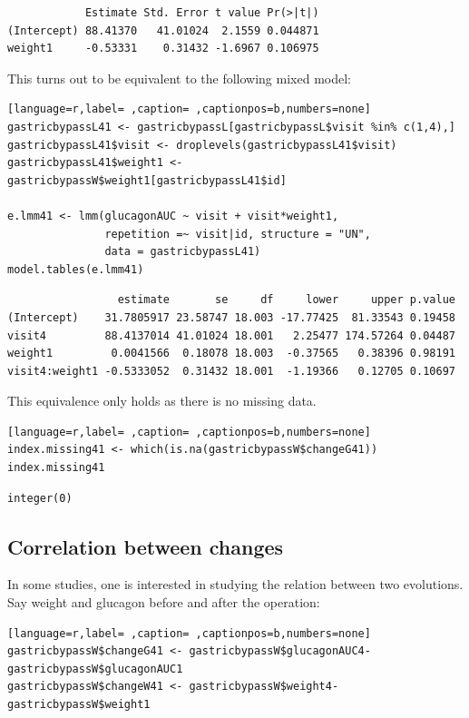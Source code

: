 \documentclass[12pt]{article}
\begin{document}
\begin{verbatim}
            Estimate Std. Error t value Pr(>|t|)
(Intercept) 88.41370   41.01024  2.1559 0.044871
weight1     -0.53331    0.31432 -1.6967 0.106975
\end{verbatim}


This turns out to be equivalent to the following mixed model:
\begin{lstlisting}[language=r,label= ,caption= ,captionpos=b,numbers=none]
gastricbypassL41 <- gastricbypassL[gastricbypassL$visit %in% c(1,4),]
gastricbypassL41$visit <- droplevels(gastricbypassL41$visit)
gastricbypassL41$weight1 <- gastricbypassW$weight1[gastricbypassL41$id]

e.lmm41 <- lmm(glucagonAUC ~ visit + visit*weight1,
               repetition =~ visit|id, structure = "UN",
               data = gastricbypassL41)
model.tables(e.lmm41)
\end{lstlisting}

\begin{verbatim}
                 estimate       se     df     lower     upper p.value
(Intercept)    31.7805917 23.58747 18.003 -17.77425  81.33543 0.19458
visit4         88.4137014 41.01024 18.001   2.25477 174.57264 0.04487
weight1         0.0041566  0.18078 18.003  -0.37565   0.38396 0.98191
visit4:weight1 -0.5333052  0.31432 18.001  -1.19366   0.12705 0.10697
\end{verbatim}


This equivalence only holds as there is no missing data.
\begin{lstlisting}[language=r,label= ,caption= ,captionpos=b,numbers=none]
index.missing41 <- which(is.na(gastricbypassW$changeG41))
index.missing41
\end{lstlisting}

\begin{verbatim}
integer(0)
\end{verbatim}


\clearpage

\subsection{Correlation between changes}
\label{sec:orgd8222b3}

In some studies, one is interested in studying the relation between
two evolutions. Say weight and glucagon before and after the
operation:
\begin{lstlisting}[language=r,label= ,caption= ,captionpos=b,numbers=none]
gastricbypassW$changeG41 <- gastricbypassW$glucagonAUC4-gastricbypassW$glucagonAUC1
gastricbypassW$changeW41 <- gastricbypassW$weight4-gastricbypassW$weight1
\end{lstlisting}
\end{document}
